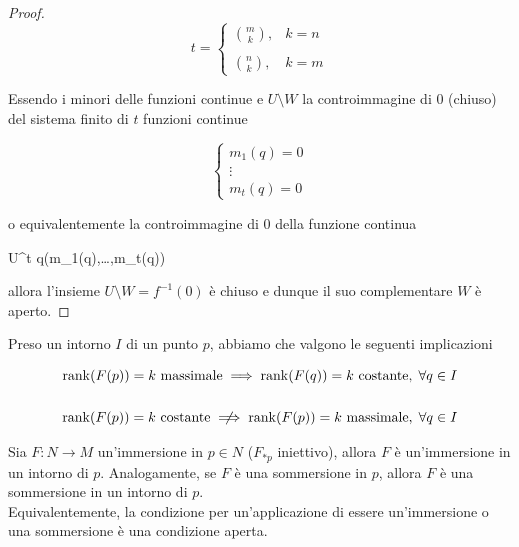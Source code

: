 \begin{proof}
	\begin{equation}
		t = %
		\begin{cases}
			\displaystyle \binom{m}{k}, & k = n \\\\
			\displaystyle \binom{n}{k}, & k = m
		\end{cases}
	\end{equation}

	Essendo i minori delle funzioni continue e $ U \setminus W $ la controimmagine di 0 (chiuso) del sistema finito di $ t $ funzioni continue
	
	\begin{equation}
		\begin{cases}
			m_{1}(q) = 0\\
			\vdots\\
			m_{t}(q) = 0
		\end{cases}
	\end{equation}

	o equivalentemente la controimmagine di 0 della funzione continua
	
		{U}{\R^{t}}
		{q}{(m_{1}(q),\dots,m_{t}(q))}

	allora l'insieme $ U \setminus W = f^{-1}(0) $ è chiuso e dunque il suo complementare $ W $ è aperto.
\end{proof}

\begin{remark}
	Preso un intorno $ I $ di un punto $ p $, abbiamo che valgono le seguenti implicazioni
	
	\begin{gather}
		\rank(F(p)) = k \text{ massimale} \implies \rank(F(q)) = k \text{ costante}, \; \forall q \in I \\
		\nonumber \\
		\rank(F(p)) = k \text{ costante} \notimplies \rank(F(p)) = k \text{ massimale}, \; \forall q \in I
	\end{gather}
\end{remark}

\begin{corollary}
	Sia $ F : N \to M $ un'immersione in $ p \in N $ ($ F_{*p} $ iniettivo), allora $ F $ è un'immersione in un intorno di $ p $. Analogamente, se $ F $ è una sommersione in $ p $, allora $ F $ è una sommersione in un intorno di $ p $.\\
	Equivalentemente, la condizione per un'applicazione di essere un'immersione o una sommersione è una condizione aperta.
\end{corollary}

